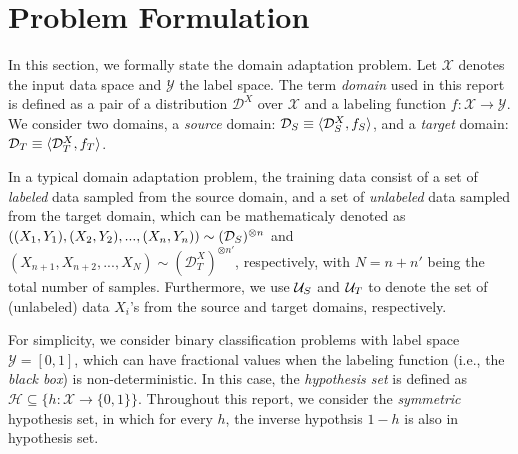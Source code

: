 \section{Problem Formulation}\label{sect:prob_form}
In this section, we formally state the domain adaptation problem. Let $\mathcal{X}$ denotes the input data space and $\mathcal{Y}$ the label space. The term \textit{domain} used in this report is defined as a pair of a distribution $\mathcal{D}^X$ over $\mathcal{X}$ and a labeling function $f: \mathcal{X} \rightarrow \mathcal{Y}$. We consider two domains, a \textit{source} domain: $\mathcal{D}_S \equiv \langle \mathcal{D}^X_S, f_S \rangle$, and a \textit{target} domain: $\mathcal{D}_T \equiv \langle \mathcal{D}^X_T, f_T \rangle$.

In a typical domain adaptation problem, the training data consist of a set of \textit{labeled} data sampled from the source domain, and a set of \textit{unlabeled} data sampled from the target domain, which can be mathematicaly denoted as $((X_1,Y_1),(X_2,Y_2),...,(X_n,Y_n)) \sim (\mathcal{D}_S)^{\otimes n}$ and $(X_{n+1},X_{n+2},...,X_N) \sim (\mathcal{D}^X_T)^{\otimes n'}$, respectively, with $N=n+n'$ being the total number of samples. Furthermore, we use $\mathcal{U}_S$ and $\mathcal{U}_T$ to denote the set of (unlabeled) data $X_i$'s from the source and target domains, respectively.


For simplicity, we consider binary classification problems with label space $\mathcal{Y}=[0, 1]$, which can have fractional values when the labeling function (i.e., the \textit{black box}) is non-deterministic. In this case, the \textit{hypothesis set} is defined as $\mathcal{H} \subseteq \{h:\mathcal{X} \rightarrow \{0,1\}\}$. Throughout this report, we consider the \textit{symmetric} hypothesis set, in which for every $h$, the inverse hypothsis $1-h$ is also in hypothesis set.

